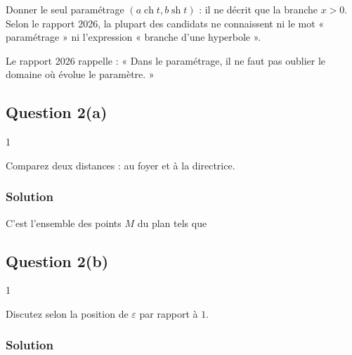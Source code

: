 \documentclass[11pt,a4paper]{article}
\newcommand{\equationajustee}[1]{%
  \sbox{\boiteequation}{$\displaystyle #1$}%
  \ifdim\wd\boiteequation>\linewidth
    \[\resizebox{\linewidth}{!}{\usebox{\boiteequation}}\]%
  \else
    \[#1\]%
  \fi}
\begin{document}
\begin{piege}

Donner le seul paramétrage \((a\operatorname{ch}t,b\operatorname{sh}t)\) : il ne décrit que la branche \(x>0\). Selon le rapport 2026, la plupart des candidats ne connaissent ni le mot « paramétrage » ni l'expression « branche d'une hyperbole ».

\end{piege}

\begin{jury}

Le rapport 2026 rappelle : « Dans le paramétrage, il ne faut pas oublier le domaine où évolue le paramètre. »

\end{jury}

\hypertarget{question-2a}{%
\subsection{Question 2(a)}\label{question-2a}}

\begin{indication}{1}

Comparez deux distances : au foyer et à la directrice.

\end{indication}

\hypertarget{solution-17}{%
\subsubsection{Solution}\label{solution-17}}

C'est l'ensemble des points \(M\) du plan tels que

\equationajustee{\boxed{MF=\varepsilon\,d(M,\mathcal{D}).}}

\hypertarget{question-2b}{%
\subsection{Question 2(b)}\label{question-2b}}

\begin{indication}{1}

Discutez selon la position de \(\varepsilon\) par rapport à \(1\).

\end{indication}

\hypertarget{solution-18}{%
\subsubsection{Solution}\label{solution-18}}
\end{document}
